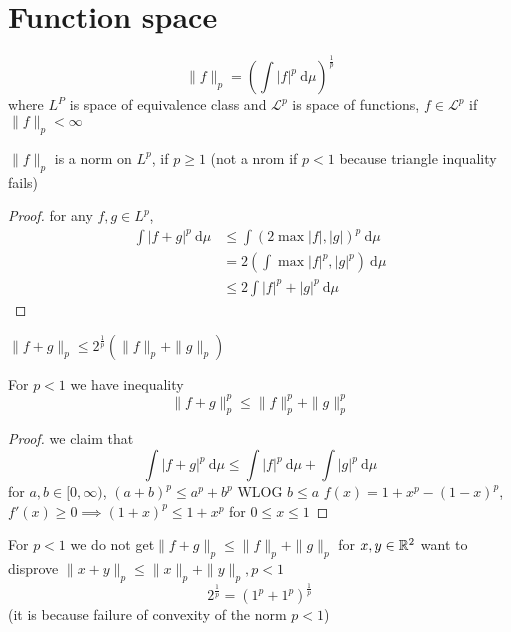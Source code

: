 
  

\section{Function space}

\begin{definition}
  \[\|f\|_p = \left(\int |f|^p \ \mathrm{d}\mu\right)^{\frac1p}\]
  where $L^P$ is space of equivalence class and $\mathcal{L}^p$ is space of functions,
  $f \in \mathcal{L}^p$ if $\|f\|_p < \infty$
\end{definition}

\begin{theorem}
  $\|f\|_p$ is a norm on $L^p$, if $p \ge 1$ (not a nrom if $p < 1$ because triangle inquality fails)
\end{theorem}
\begin{proof}
  for any $f, g \in L^p$, 
  \begin{align*}
    \int |f+g|^p \ \mathrm{d}\mu &\le \int (2 \max{|f|,|g|})^p \ \mathrm{d}\mu \\
    &= 2\left(\int \max |f|^p, |g|^p\right) \ \mathrm{d}\mu \\
    &\le 2\int |f|^p + |g|^p\ \mathrm{d}\mu 
  \end{align*}
\end{proof}

\begin{remark}
  $\|f+g\|_p \le 2^{\frac1p}(\|f\|_p + \|g\|_p)$
\end{remark}

\begin{theorem}
  For $p < 1$ we have inequality
  \[\|f+g\|_p^p \le \|f\|_p^p + \|g\|_p^p\]
\end{theorem}

\begin{proof}
  we claim that
  \[\int |f+g|^p \ \mathrm{d}\mu \le \int |f|^p \ \mathrm{d}\mu + \int |g|^p\ \mathrm{d}\mu\]
  for $a, b \in [0, \infty)$, $(a+b)^p \le a^p + b^p$
  WLOG $b \le a$
  $f(x) = 1+x^p - (1-x)^p$, $f'(x) \ge 0 \implies (1+x)^p \le 1 + x^p$ for $0 \le x \le 1$ 
\end{proof}

\begin{remark}
  For $p < 1$ we do not get$\|f+g\|_p \le \|f\|_p + \|g\|_p$
  for $x, y \in \mathbb R^2$ want to disprove $\|x+y\|_p \le \|x\|_p + \|y\|_p, p < 1$
  $$2^{\frac1p} = (1^p + 1^p)^{\frac1p}$$ (it is because failure of convexity of the norm $p < 1$)
\end{remark}




